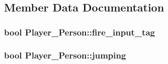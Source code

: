 \subsection{Member Data Documentation}
\subsubsection[{\texorpdfstring{fire\+\_\+input\+\_\+tag}{fire_input_tag}}]{\setlength{\rightskip}{0pt plus 5cm}bool Player\+\_\+\+Person\+::fire\+\_\+input\+\_\+tag}\hypertarget{class_player___person_abd97b17132011c46ee81603f813a43d5}{}\label{class_player___person_abd97b17132011c46ee81603f813a43d5}
\subsubsection[{\texorpdfstring{jumping}{jumping}}]{\setlength{\rightskip}{0pt plus 5cm}bool Player\+\_\+\+Person\+::jumping}\hypertarget{class_player___person_a1ad501a127f6f2803929aa40df0ad93f}{}\label{class_player___person_a1ad501a127f6f2803929aa40df0ad93f}
